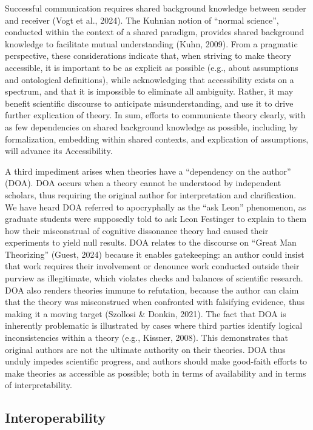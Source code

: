 \documentclass[
  man,floatsintext]{apa6}
\begin{document}
Successful communication requires shared background knowledge between sender and receiver (Vogt et al., 2024).
The Kuhnian notion of ``normal science'', conducted within the context of a shared paradigm, provides shared background knowledge to facilitate mutual understanding (Kuhn, 2009).
From a pragmatic perspective, these considerations indicate that,
when striving to make theory accessible,
it is important to be as explicit as possible (e.g., about assumptions and ontological definitions),
while acknowledging that accessibility exists on a spectrum,
and that it is impossible to eliminate all ambiguity.
Rather, it may benefit scientific discourse to anticipate misunderstanding,
and use it to drive further explication of theory.
In sum, efforts to communicate theory clearly, with as few dependencies on shared background knowledge as possible, including by formalization, embedding within shared contexts, and explication of assumptions, will advance its Accessibility.

A third impediment arises when theories have a ``dependency on the author'' (DOA).
DOA occurs when a theory cannot be understood by independent scholars,
thus requiring the original author for interpretation and clarification.
We have heard DOA referred to apocryphally as the ``ask Leon'' phenomenon,
as graduate students were supposedly told to ask Leon Festinger to explain to them how their misconstrual of cognitive dissonance theory had caused their experiments to yield null results.
DOA relates to the discourse on ``Great Man Theorizing'' (Guest, 2024) because it enables gatekeeping: an author could insist that work requires their involvement or denounce work conducted outside their purview as illegitimate,
which violates checks and balances of scientific research.
DOA also renders theories immune to refutation,
because the author can claim that the theory was misconstrued when confronted with falsifying evidence, thus making it a moving target (Szollosi \& Donkin, 2021).
The fact that DOA is inherently problematic is illustrated by cases where third parties identify logical inconsistencies within a theory (e.g., Kissner, 2008).
This demonstrates that original authors are not the ultimate authority on their theories.
DOA thus unduly impedes scientific progress, and authors should make good-faith efforts to make theories as accessible as possible; both in terms of availability and in terms of interpretability.

\subsection{Interoperability}\label{interoperability}
\end{document}
